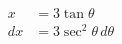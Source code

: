 \documentclass[preview]{standalone}
\begin{document}
\begin{align*}
x&=3\tan\theta \\ dx&=3\sec^2\theta \, d\theta
\end{align*}
\end{document}
